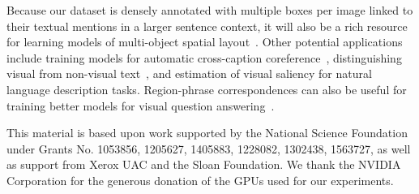 \documentclass[twocolumn]{svjour3}
\begin{document}
Because our dataset is densely annotated with multiple boxes per image linked to their textual mentions in a larger sentence context, it will also be a rich resource for learning models of multi-object spatial layout~\citep{Farhadi10,fidler2013,Kulkarni11}. Other potential applications include training models for automatic cross-caption coreference~\citep{hodosh2010cross}, distinguishing visual from non-visual text~\citep{Dodge2012}, and estimation of visual saliency for natural language description tasks.  Region-phrase correspondences can also be useful for training better models for visual question answering~\citep{tommasi2016,fukui16emnlp}.

\begin{acknowledgements} This material is based upon work supported by the National Science Foundation under Grants No. 1053856, 1205627, 1405883, 1228082, 1302438, 1563727, as well as support from Xerox UAC and the Sloan Foundation. We thank the NVIDIA Corporation for the generous donation of the GPUs used for our experiments.
\end{acknowledgements}



\end{document}
